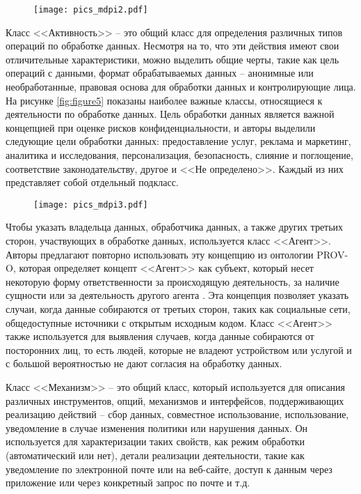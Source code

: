 \documentclass[../main]{subfiles}
\begin{document}
\begin{figure}[H]
    \centering
    {\texttt{[image: pics\_mdpi2.pdf]}}
    \vspace{-\baselineskip}
\end{figure}

Класс <<Активность>> -- это общий класс для определения различных типов операций по обработке данных. Несмотря на то, что эти действия имеют свои отличительные характеристики, можно выделить общие черты, такие как цель операций с данными, формат обрабатываемых данных -- анонимные или необработанные, правовая основа для обработки данных и контролирующие лица. На рисунке \ref{fig:figure5} показаны наиболее важные классы, относящиеся к деятельности по обработке данных. Цель обработки данных является важной концепцией при оценке рисков конфиденциальности, и авторы выделили следующие цели обработки данных: предоставление услуг, реклама и маркетинг, аналитика и исследования, персонализация, безопасность, слияние и поглощение, соответствие законодательству, другое и <<Не определено>>. Каждый из них представляет собой отдельный подкласс.

\begin{figure}[H]
    \centering
    {\texttt{[image: pics\_mdpi3.pdf]}}
    \vspace{-\baselineskip}
\end{figure}

Чтобы указать владельца данных, обработчика данных, а также других третьих сторон, участвующих в обработке данных, используется класс <<Агент>>. Авторы предлагают повторно использовать эту концепцию из онтологии PROV-O, которая определяет концепт <<Агент>> как субъект, который несет некоторую форму ответственности за происходящую деятельность, за наличие сущности или за деятельность другого агента \cite{MDPI22}. Эта концепция позволяет указать случаи, когда данные собираются от третьих сторон, таких как социальные сети, общедоступные источники с открытым исходным кодом. Класс <<Агент>> также используется для выявления случаев, когда данные собираются от посторонних лиц, то есть людей, которые не владеют устройством или услугой и с большой вероятностью не дают согласия на обработку данных.

Класс <<Механизм>> -- это общий класс, который используется для описания различных инструментов, опций, механизмов и интерфейсов, поддерживающих реализацию действий -- сбор данных, совместное использование, использование, уведомление в случае изменения политики или нарушения данных. Он используется для характеризации таких свойств, как режим обработки (автоматический или нет), детали реализации деятельности, такие как уведомление по электронной почте или на веб-сайте, доступ к данным через приложение или через конкретный запрос по почте и т.д.
\end{document}
